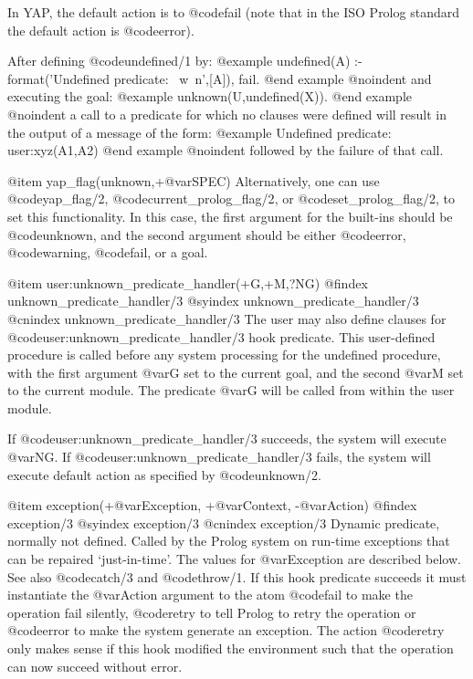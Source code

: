 {{{{In YAP, the default action is to @code{fail} (note that in the ISO
Prolog standard the default action is @code{error}).

After defining @code{undefined/1} by:
@example
undefined(A) :- format('Undefined predicate: ~w~n',[A]), fail.
@end example
@noindent
and executing the goal:
@example
unknown(U,undefined(X)).
@end example
@noindent
a call to a predicate for which no clauses were defined will result in
the output of a message of the form:
@example
Undefined predicate: user:xyz(A1,A2)
@end example
@noindent
followed by the failure of that call.

@item yap_flag(unknown,+@var{SPEC})
Alternatively, one can use @code{yap_flag/2},
@code{current_prolog_flag/2}, or @code{set_prolog_flag/2}, to set this
functionality. In this case, the first argument for the built-ins should
be @code{unknown}, and the second argument should be either
@code{error}, @code{warning}, @code{fail}, or a goal.

@item user:unknown_predicate_handler(+G,+M,?NG)
@findex unknown_predicate_handler/3
@syindex unknown_predicate_handler/3
@cnindex unknown_predicate_handler/3
The user may also define clauses for
@code{user:unknown_predicate_handler/3} hook predicate. This
user-defined procedure is called before any system processing for the
undefined procedure, with the first argument @var{G} set to the current
goal, and the second @var{M} set to the current module. The predicate
@var{G} will be called from within the user module.

If @code{user:unknown_predicate_handler/3} succeeds, the system will
execute @var{NG}. If  @code{user:unknown_predicate_handler/3} fails, the
system will execute default action as specified by @code{unknown/2}.

@item exception(+@var{Exception}, +@var{Context}, -@var{Action})
@findex exception/3
@syindex exception/3
@cnindex exception/3
 Dynamic predicate, normally not defined. Called by the Prolog system on run-time exceptions that can be repaired `just-in-time'. The values for @var{Exception} are described below. See also @code{catch/3} and @code{throw/1}.
If this hook predicate succeeds it must instantiate the @var{Action} argument to the atom @code{fail} to make the operation fail silently, @code{retry} to tell Prolog to retry the operation or @code{error} to make the system generate an exception. The action @code{retry} only makes sense if this hook modified the environment such that the operation can now succeed without error.

}}}}
